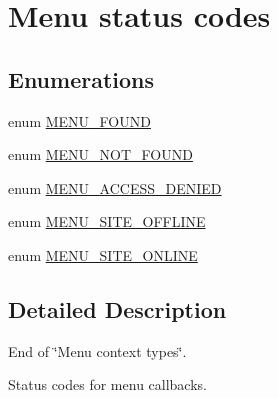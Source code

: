 \hypertarget{group__menu__status__codes}{
\section{Menu status codes}
\label{group__menu__status__codes}
}
\subsection*{Enumerations}
\begin{DoxyCompactItemize}
\item 
enum \hyperlink{group__menu__status__codes_gabf2843e858b524578380ab90a4ce8048}{MENU\_\-FOUND} 
\item 
enum \hyperlink{group__menu__status__codes_ga67a38f79c8ab91fb6230daaaad6176f4}{MENU\_\-NOT\_\-FOUND} 
\item 
enum \hyperlink{group__menu__status__codes_ga87e8c6c6b42f3399cbe817d4d19cd892}{MENU\_\-ACCESS\_\-DENIED} 
\item 
enum \hyperlink{group__menu__status__codes_gad6222551ed027f4f367e11b11935cff9}{MENU\_\-SITE\_\-OFFLINE} 
\item 
enum \hyperlink{group__menu__status__codes_gaac31a368c93d567958be6f96e3f38425}{MENU\_\-SITE\_\-ONLINE} 
\end{DoxyCompactItemize}


\subsection{Detailed Description}
End of \char`\"{}Menu context types\char`\"{}.

Status codes for menu callbacks. 

